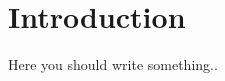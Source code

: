 \documentclass[../Template.tex]{subfiles}
\begin{document}
\chapter{Introduction \label{chap:Introduction}}
Here you should write something..\\
\end{document}
